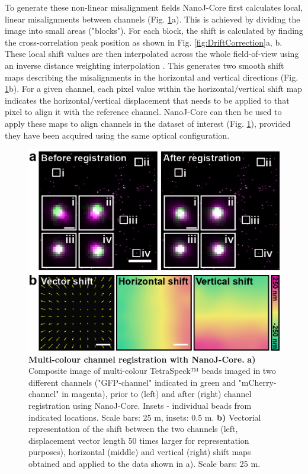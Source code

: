  To generate these non-linear misalignment fields NanoJ-Core first calculates local, linear misalignments between channels (Fig. \ref{fig:ChannelAlignment}a). This is achieved by dividing the image into small areas ("blocks"). For each block, the shift is calculated by finding the cross-correlation peak position as shown in Fig. \ref{fig:DriftCorrection}a, b. These local shift values are then interpolated across the whole field-of-view using an inverse distance weighting interpolation \cite{shepard1968two}. This generates two smooth shift maps describing the misalignments in the horizontal and vertical directions (Fig. \ref{fig:ChannelAlignment}b). For a given channel, each pixel value within the horizontal/vertical shift map indicates the horizontal/vertical displacement that needs to be applied to that pixel to align it with the reference channel. NanoJ-Core can then be used to apply these maps to align channels in the dataset of interest (Fig. \ref{fig:ChannelAlignment}), provided they have been acquired using the same optical configuration.
 
 \begin{figure}[!t]
    \centering
    \includegraphics{Figures/FigureChannelAlignment_v4.png}
    \caption{\textbf{Multi-colour channel registration with NanoJ-Core.} \textbf{a)} Composite image of multi-colour TetraSpeck™ beads imaged in two different channels ("GFP-channel" indicated in green and "mCherry-channel" in magenta), prior to (left) and after (right) channel registration using NanoJ-Core. Insets - individual beads from indicated locations. Scale bars: 25 \micro m, insets: 0.5 \micro m. \textbf{b)} Vectorial representation of the shift between the two channels (left, displacement vector length 50 times larger for representation purposes), horizontal (middle) and vertical (right) shift maps obtained and applied to the data shown in a). Scale bars: 25 \micro m.}
    \label{fig:ChannelAlignment}
 \end{figure}
 
